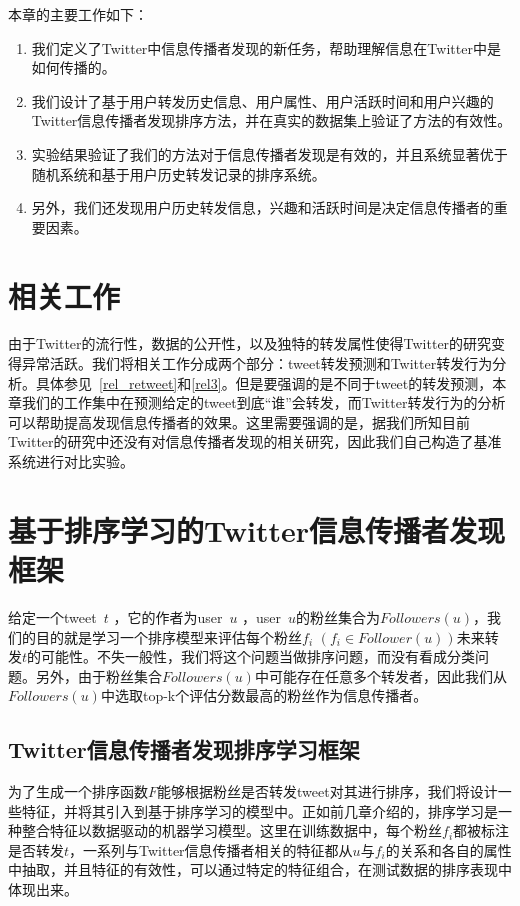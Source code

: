 本章的主要工作如下：
\begin{enumerate}
\item 我们定义了Twitter中信息传播者发现的新任务，帮助理解信息在Twitter中是如何传播的。
\item 我们设计了基于用户转发历史信息、用户属性、用户活跃时间和用户兴趣的Twitter信息传播者发现排序方法，并在真实的数据集上验证了方法的有效性。
\item 实验结果验证了我们的方法对于信息传播者发现是有效的，并且系统显著优于随机系统和基于用户历史转发记录的排序系统。
\item 另外，我们还发现用户历史转发信息，兴趣和活跃时间是决定信息传播者的重要因素。
\end{enumerate}

\section{相关工作}
由于Twitter的流行性，数据的公开性，以及独特的转发属性使得Twitter的研究变得异常活跃。我们将相关工作分成两个部分：tweet转发预测和Twitter转发行为分析。具体参见~\ref{rel_retweet}和\ref{rel3}。但是要强调的是不同于tweet的转发预测，本章我们的工作集中在预测给定的tweet到底“谁”会转发，而Twitter转发行为的分析可以帮助提高发现信息传播者的效果。这里需要强调的是，据我们所知目前Twitter的研究中还没有对信息传播者发现的相关研究，因此我们自己构造了基准系统进行对比实验。

\section{基于排序学习的Twitter信息传播者发现框架 }
给定一个tweet~$t$ ，它的作者为user~$u$ ，user~$u$的粉丝集合为$Followers(u)$，我们的目的就是学习一个排序模型来评估每个粉丝$f_i$ $(f_i\in Follower(u))$未来转发$t$的可能性。不失一般性，我们将这个问题当做排序问题，而没有看成分类问题。另外，由于粉丝集合$Followers(u)$中可能存在任意多个转发者，因此我们从$Followers(u)$中选取top-k个评估分数最高的粉丝作为信息传播者。

 \subsection{Twitter信息传播者发现排序学习框架}
为了生成一个排序函数$F$能够根据粉丝是否转发tweet对其进行排序，我们将设计一些特征，并将其引入到基于排序学习的模型中。正如前几章介绍的，排序学习是一种整合特征以数据驱动的机器学习模型。这里在训练数据中，每个粉丝$f_i$都被标注是否转发$t$，一系列与Twitter信息传播者相关的特征都从$u$与$f_i$的关系和各自的属性中抽取，并且特征的有效性，可以通过特定的特征组合，在测试数据的排序表现中体现出来。
 
